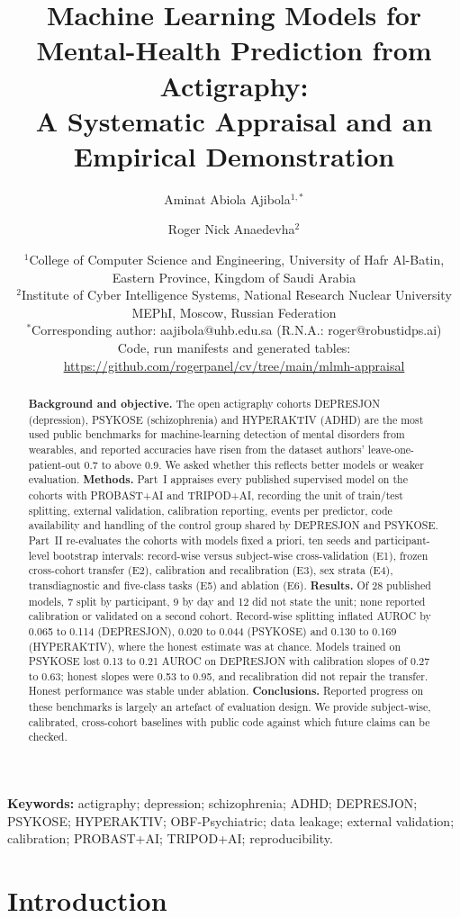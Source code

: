 \documentclass[11pt,a4paper]{article}
\title{\large Machine Learning Models for Mental-Health Prediction from Actigraphy:\\
A Systematic Appraisal and an Empirical Demonstration}
\author{Aminat Abiola Ajibola$^{1,*}$ \and Roger Nick Anaedevha$^{2}$}
\date{\footnotesize $^{1}$College of Computer Science and Engineering, University of Hafr Al-Batin, Eastern Province, Kingdom of Saudi Arabia \\
$^{2}$Institute of Cyber Intelligence Systems, National Research Nuclear University MEPhI, Moscow, Russian Federation \\[0.3em]
$^{*}$Corresponding author: aajibola@uhb.edu.sa \quad (R.N.A.: roger@robustidps.ai) \\[0.4em]
Code, run manifests and generated tables: \url{https://github.com/rogerpanel/cv/tree/main/mlmh-appraisal}}
\begin{document}
\maketitle
\linenumbers

\begin{abstract}
\textbf{Background and objective.} The open actigraphy cohorts DEPRESJON (depression), PSYKOSE
(schizophrenia) and HYPERAKTIV (ADHD) are the most used public benchmarks for machine-learning
detection of mental disorders from wearables, and reported accuracies have risen from the dataset
authors' leave-one-patient-out 0.7 to above 0.9. We asked whether this reflects better models or
weaker evaluation.
\textbf{Methods.} Part~I appraises every published supervised model on the cohorts with
PROBAST+AI and TRIPOD+AI, recording the unit of train/test splitting, external validation,
calibration reporting, events per predictor, code availability and handling of the control group
shared by DEPRESJON and PSYKOSE. Part~II re-evaluates the cohorts with models fixed a priori, ten
seeds and participant-level bootstrap intervals: record-wise versus subject-wise cross-validation
(E1), frozen cross-cohort transfer (E2), calibration and recalibration (E3), sex strata (E4),
transdiagnostic and five-class tasks (E5) and ablation (E6).
\textbf{Results.} Of 28 published models, 7 split by participant, 9 by day and 12 did not state
the unit; none reported calibration or validated on a second cohort. Record-wise splitting
inflated AUROC by 0.065 to 0.114 (DEPRESJON), 0.020 to 0.044 (PSYKOSE) and 0.130 to 0.169
(HYPERAKTIV), where the honest estimate was at chance. Models trained on PSYKOSE lost 0.13 to
0.21 AUROC on DEPRESJON with calibration slopes of 0.27 to 0.63; honest slopes were 0.53 to 0.95,
and recalibration did not repair the transfer. Honest performance was stable under ablation.
\textbf{Conclusions.} Reported progress on these benchmarks is largely an artefact of evaluation
design. We provide subject-wise, calibrated, cross-cohort baselines with public code against
which future claims can be checked.
\end{abstract}

\noindent\textbf{Keywords:} actigraphy; depression; schizophrenia; ADHD; DEPRESJON; PSYKOSE; HYPERAKTIV; OBF-Psychiatric; data leakage; external validation; calibration; PROBAST+AI; TRIPOD+AI; reproducibility.

\section{Introduction}
\end{document}
